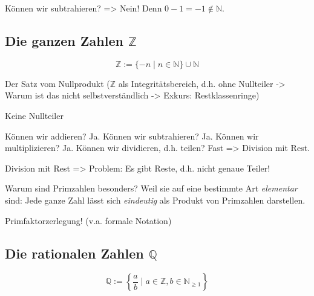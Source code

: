 Können wir subtrahieren? => Nein! Denn \(0 - 1 = -1 \notin \mathbb N\). 

\subsection{Die ganzen Zahlen \(\mathbb Z\)}
\begin{definition}
    \begin{equation*}
        \mathbb Z := \{-n \mid n \in \mathbb N\} \cup \mathbb N
    \end{equation*}
\end{definition}
Der Satz vom Nullprodukt (\(\mathbb Z\) als Integritätsbereich, d.h. ohne Nullteiler -> Warum ist das nicht selbstverständlich -> Exkurs: Restklassenringe)

\begin{theorem}
    Keine Nullteiler
\end{theorem}

Können wir addieren? Ja. Können wir subtrahieren? Ja. Können wir multiplizieren? Ja. Können wir dividieren, d.h. teilen? Fast => Division mit Rest. 

\begin{theorem}
    Division mit Rest => Problem: Es gibt Reste, d.h. nicht genaue Teiler!
\end{theorem}

\begin{definition}
    
\end{definition}

\begin{definition}[Primzahl]
    
\end{definition}

Warum sind Primzahlen besonders? Weil sie auf eine bestimmte Art \textit{elementar} sind: Jede ganze Zahl lässt sich \textit{eindeutig} als Produkt von Primzahlen darstellen. 

\begin{theorem}
    Primfaktorzerlegung! (v.a. formale Notation)
\end{theorem}

\subsection{Die rationalen Zahlen \(\mathbb Q\)}
\begin{definition}
    \begin{equation*}
        \mathbb Q := \left\{\frac{a}{b}\mid a \in \mathbb Z, b \in \mathbb N_{\geq 1}\right\}
    \end{equation*}
\end{definition}

